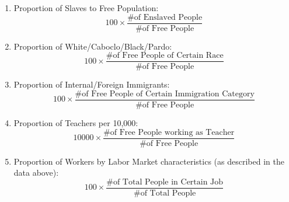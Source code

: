 \documentclass{article}
\begin{document}
\begin{enumerate}
  \item Proportion of Slaves to Free Population:
  $$ 100 \times \frac{\text{\# of Enslaved People}}{\text{\# of Free People}} $$

  \item Proportion of White/Caboclo/Black/Pardo:
  $$ 100 \times \frac{\text{\# of Free People of Certain Race}}{\text{\# of Free People}}$$

  \item Proportion of Internal/Foreign Immigrants:
  $$ 100 \times \frac{\text{\# of Free People of Certain Immigration Category}}{\text{\# of Free People}}$$
  \item Proportion of Teachers per 10,000:
  $$ 10000 \times \frac{\text{\# of Free People working as Teacher}}{\text{\# of Free People}}$$
  \item Proportion of Workers by Labor Market characteristics (as described in the data above):
  $$ 100 \times \frac{\text{\# of Total People in Certain Job}}{\text{\# of Total People}}$$
\end{enumerate}
\end{document}
